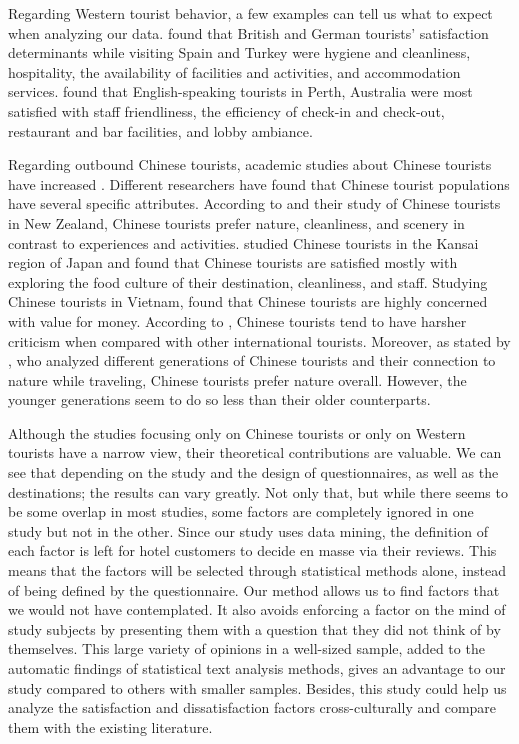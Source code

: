 \documentclass[smallextended,natbib]{svjour3}       %
\begin{document}
    Regarding Western tourist behavior, a few examples can tell us what to expect when analyzing our data. \cite{kozak2002} found that British and German tourists' satisfaction determinants while visiting Spain and Turkey were hygiene and cleanliness, hospitality, the availability of facilities and activities, and accommodation services. \cite{shanka2004} found that English-speaking tourists in Perth, Australia were most satisfied with staff friendliness, the efficiency of check-in and check-out, restaurant and bar facilities, and lobby ambiance. 

    Regarding outbound Chinese tourists, academic studies about Chinese tourists have increased \cite[][]{sun2017}. Different researchers have found that Chinese tourist populations have several specific attributes. According to \cite{ryan2001} and their study of Chinese tourists in New Zealand, Chinese tourists prefer nature, cleanliness, and scenery in contrast to experiences and activities. \cite{dongyang2015} studied Chinese tourists in the Kansai region of Japan and found that Chinese tourists are satisfied mostly with exploring the food culture of their destination, cleanliness, and staff. Studying Chinese tourists in Vietnam, \cite{truong2009} found that Chinese tourists are highly concerned with value for money. According to \cite{liu2019}, Chinese tourists tend to have harsher criticism when compared with other international tourists. Moreover, as stated by \cite{gao2017chinese}, who analyzed different generations of Chinese tourists and their connection to nature while traveling, Chinese tourists prefer nature overall. However, the younger generations seem to do so less than their older counterparts. 

    Although the studies focusing only on Chinese tourists or only on Western tourists have a narrow view, their theoretical contributions are valuable. We can see that depending on the study and the design of questionnaires, as well as the destinations; the results can vary greatly. Not only that, but while there seems to be some overlap in most studies, some factors are completely ignored in one study but not in the other. Since our study uses data mining, the definition of each factor is left for hotel customers to decide en masse via their reviews. This means that the factors will be selected through statistical methods alone, instead of being defined by the questionnaire. Our method allows us to find factors that we would not have contemplated. It also avoids enforcing a factor on the mind of study subjects by presenting them with a question that they did not think of by themselves. This large variety of opinions in a well-sized sample, added to the automatic findings of statistical text analysis methods, gives an advantage to our study compared to others with smaller samples. Besides, this study could help us analyze the satisfaction and dissatisfaction factors cross-culturally and compare them with the existing literature.
\end{document}
